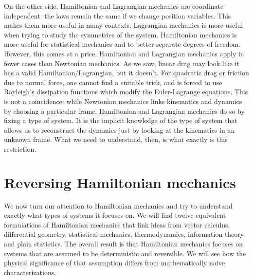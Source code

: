 On the other side, Hamiltonian and Lagrangian mechanics are coordinate independent: the laws remain the same if we change position variables. This makes them more useful in many contexts. Lagrangian mechanics is more useful when trying to study the symmetries of the system. Hamiltonian mechanics is more useful for statistical mechanics and to better separate degrees of freedom. However, this comes at a price. Hamiltonian and Lagrangian mechanics apply in fewer cases than Newtonian mechanics. As we saw, linear drag may look like it has a valid Hamiltonian/Lagrangian, but it doesn't. For quadratic drag or friction due to normal force, one cannot find a suitable trick, and is forced to use Rayleigh’s dissipation functions which modify the Euler-Lagrange equations. This is not a coincidence: while Newtonian mechanics links kinematics and dynamics by choosing a particular frame, Hamiltonian and Lagrangian mechanics do so by fixing a type of system. It is the implicit knowledge of the type of system that allows us to reconstruct the dynamics just by looking at the kinematics in an unknown frame. What we need to understand, then, is what exactly is this restriction.

\section{Reversing Hamiltonian mechanics}

We now turn our attention to Hamiltonian mechanics and try to understand exactly what types of systems it focuses on. We will find twelve equivalent formulations of Hamiltonian mechanics that link ideas from vector calculus, differential geometry, statistical mechanics, thermodynamics, information theory and plain statistics. The overall result is that Hamiltonian mechanics focuses on systems that are assumed to be deterministic and reversible. We will see how the physical significance of that assumption differs from mathematically naive characterizations.

